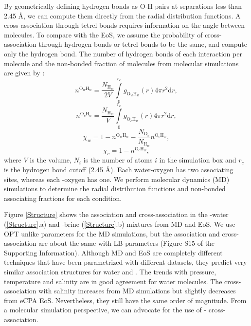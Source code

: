 By geometrically defining hydrogen bonds as O-H pairs at separations less than 2.45 \AA \cite{Vlcek2011, Dufal2015}, we can compute them directly from the radial distribution functions. A cross-association through tetrel bonds requires information on the angle between molecules. To compare with the EoS, we assume the probability of cross-association through hydrogen bonds or tetrel bonds to be the same, and compute only the hydrogen bond. The number of hydrogen bonds of each interaction per molecule and the non-bonded fraction of molecules from molecular simulations are given by \cite{Dufal2015}:
\begin{equation}
    n^{\text{O}_w\text{H}_w} = \frac{N_{\text{H}_w}}{2V}\int\limits_0 ^{r_c} g_{\text{O}_w\text{H}_w}(r) 4 \pi r^2 \mathrm{d}r, 
    \label{OwHw}
\end{equation}
\begin{equation}
    n^{\text{O}_c\text{H}_w} = \frac{N_{\text{H}_w}}{V}\int\limits_0 ^{r_c} g_{\text{O}_c\text{H}_w}(r) 4 \pi r^2 \mathrm{d}r,
    \label{OcHw}
\end{equation}
\begin{equation}
    \chi_w = 1 -  n^{\text{O}_w\text{H}_w} - \frac{N_{\text{O}_c}}{N_{\text{H}_w}} n^{\text{O}_c\text{H}_w},
    \label{chiw_MD}
\end{equation}
\begin{equation}
    \chi_c = 1 - n^{\text{O}_c\text{H}_w},
    \label{chic_MD}
\end{equation}
where $V$ is the volume, $N_i$ is the number of atoms $i$ in the simulation box and $r_c$ is the hydrogen bond cutoff (2.45 \AA). Each water-oxygen has two associating sites, whereas each -oxygen has one. We perform molecular dynamics (MD) simulations to determine the radial distribution functions and non-bonded associating fractions for each condition.

Figure \ref{Structure} shows the association and cross-association in the -water (\ref{Structure}.a) and -brine (\ref{Structure}.b) mixtures from MD and EoS. We use OPT unlike parameters for the MD simulations, but the association and cross-association are about the same with LB parameters (Figure S15 of the Supporting Information). Although MD and EoS are completely different techniques that have been parametrized with different datasets, they predict very similar association structures for water and . The trends with pressure, temperature and salinity are in good agreement for water molecules. The  cross-association with salinity increases from MD simulations but slightly decreases from eCPA EoS. Nevertheless, they still have the same order of magnitude. From a molecular simulation perspective, we can advocate for the use of - cross-association. 

